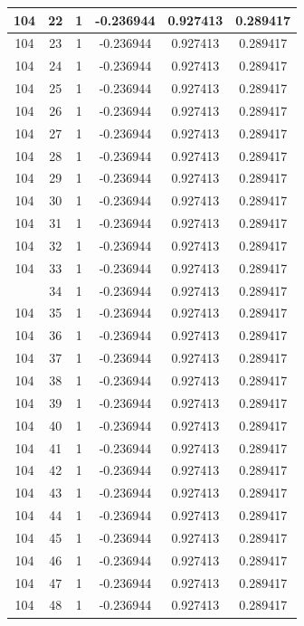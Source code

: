 \documentclass[12pt,a4paper]{article}
\numberwithin{equation}{section}
\numberwithin{figure}{section}
\numberwithin{table}{section}
\begin{document}
\begin{longtable}{|c|c|c|c|c|c|}
104 & 22 & 1 & -0.236944 & 0.927413 & 0.289417 \\ \hline
104 & 23 & 1 & -0.236944 & 0.927413 & 0.289417 \\ \hline
104 & 24 & 1 & -0.236944 & 0.927413 & 0.289417 \\ \hline
104 & 25 & 1 & -0.236944 & 0.927413 & 0.289417 \\ \hline
104 & 26 & 1 & -0.236944 & 0.927413 & 0.289417 \\ \hline
104 & 27 & 1 & -0.236944 & 0.927413 & 0.289417 \\ \hline
104 & 28 & 1 & -0.236944 & 0.927413 & 0.289417 \\ \hline
104 & 29 & 1 & -0.236944 & 0.927413 & 0.289417 \\ \hline
104 & 30 & 1 & -0.236944 & 0.927413 & 0.289417 \\ \hline
104 & 31 & 1 & -0.236944 & 0.927413 & 0.289417 \\ \hline
104 & 32 & 1 & -0.236944 & 0.927413 & 0.289417 \\ \hline
104 & 33 & 1 & -0.236944 & 0.927413 & 0.289417 \\ \hline
\pagebreak
104 & 34 & 1 & -0.236944 & 0.927413 & 0.289417 \\ \hline
104 & 35 & 1 & -0.236944 & 0.927413 & 0.289417 \\ \hline
104 & 36 & 1 & -0.236944 & 0.927413 & 0.289417 \\ \hline
104 & 37 & 1 & -0.236944 & 0.927413 & 0.289417 \\ \hline
104 & 38 & 1 & -0.236944 & 0.927413 & 0.289417 \\ \hline
104 & 39 & 1 & -0.236944 & 0.927413 & 0.289417 \\ \hline
104 & 40 & 1 & -0.236944 & 0.927413 & 0.289417 \\ \hline
104 & 41 & 1 & -0.236944 & 0.927413 & 0.289417 \\ \hline
104 & 42 & 1 & -0.236944 & 0.927413 & 0.289417 \\ \hline
104 & 43 & 1 & -0.236944 & 0.927413 & 0.289417 \\ \hline
104 & 44 & 1 & -0.236944 & 0.927413 & 0.289417 \\ \hline
104 & 45 & 1 & -0.236944 & 0.927413 & 0.289417 \\ \hline
104 & 46 & 1 & -0.236944 & 0.927413 & 0.289417 \\ \hline
104 & 47 & 1 & -0.236944 & 0.927413 & 0.289417 \\ \hline
104 & 48 & 1 & -0.236944 & 0.927413 & 0.289417 \\ \hline

\end{longtable}
\end{document}
